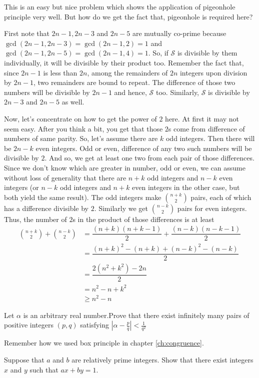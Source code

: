 \documentclass[nt_billal_v1.tex]{subfile}
\begin{document}
	\begin{solution}
		This is an easy but nice problem which shows the application of pigeonhole principle very well. But how do we get the fact that, pigeonhole is required here?
		
		First note that $2n-1,2n-3$ and $2n-5$ are mutually co-prime because $\gcd(2n-1,2n-3)=\gcd(2n-1,2)=1$ and $\gcd(2n-1,2n-5)=\gcd(2n-1,4)=1$. So, if $\mathcal{S}$ is divisible by them individually, it will be divisible by their product too. Remember the fact that, since $2n-1$ is less than $2n$, among the remainders of $2n$ integers upon division by $2n-1$, two remainders are bound to repeat. The difference of those two numbers will be divisible by $2n-1$ and hence, $\mathcal{S}$ too. Similarly, $\mathcal{S}$ is divisible by $2n-3$ and $2n-5$ as well.
		
		Now, let's concentrate on how to get the power of $2$ here. At first it may not seem easy. After you think a bit, you get that those $2$s come from difference of numbers of same parity. So, let's assume there are $k$ odd integers. Then there will be $2n-k$ even integers. Odd or even, difference of any two such numbers will be divisible by $2$. And so, we get at least one two from each pair of those differences. Since we don't know which are greater in number, odd or even, we can assume without loss of generality that there are $n+k$ odd integers and $n-k$ even integers (or $n-k$ odd integers and $n+k$ even integers in the other case, but both yield the same result). The odd integers make $\binom {n+k}2$ pairs, each of which has a difference divisible by $2$. Similarly we get $\binom{n-k}2$ pairs for even integers. Thus, the number of $2$s in the product of those differences is at least
			\begin{align*}
				\binom {n+k}2+\binom{n-k}2 & = \dfrac{(n+k)(n+k-1)}{2}+\dfrac{(n-k)(n-k-1)}{2}\\
										& = \dfrac{(n+k)^2-(n+k)+(n-k)^2-(n-k)}{2}\\
										& = \dfrac{2(n^2+k^2)-2n}{2}\\
										& = n^2-n+k^2\\
										&\geq n^2-n
			\end{align*}
	\end{solution}
	
	\begin{problem}
		Let $\alpha$ is an arbitrary real number.Prove that there exist infinitely many pairs of positive integers $(p,q)$ satisfying $\left | \alpha -\frac{p}{q} \right |<\frac{1}{q^2}$
	\end{problem}
Remember how we used box principle in chapter \eqref{ch:congruence}.
	\begin{problem}
		Suppose that $a$ and $b$ are relatively prime integers. Show that there exist integers $x$ and $y$ such that $ax + by = 1$.
	\end{problem}
	
\end{document}
